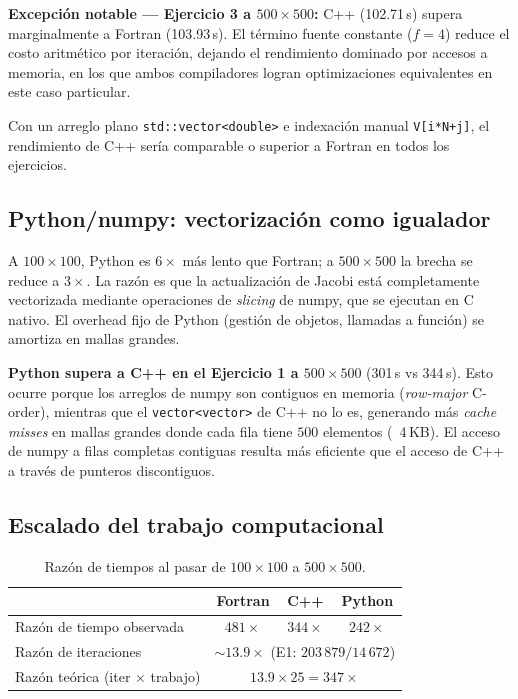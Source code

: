 \documentclass[12pt, a4paper]{article}
\begin{document}
\textbf{Excepción notable — Ejercicio 3 a $500\times500$:}
C++ (102.71\,s) supera marginalmente a Fortran (103.93\,s). El término fuente
constante ($f=4$) reduce el costo aritmético por iteración, dejando el
rendimiento dominado por accesos a memoria, en los que ambos compiladores
logran optimizaciones equivalentes en este caso particular.

Con un arreglo plano \texttt{std::vector<double>} e indexación manual
\texttt{V[i*N+j]}, el rendimiento de C++ sería comparable o superior
a Fortran en todos los ejercicios.

\subsection{Python/numpy: vectorización como igualador}

A $100\times100$, Python es $6\times$ más lento que Fortran; a $500\times500$
la brecha se reduce a $3\times$. La razón es que la actualización de Jacobi
está completamente vectorizada mediante operaciones de \emph{slicing} de numpy,
que se ejecutan en C nativo. El overhead fijo de Python (gestión de objetos,
llamadas a función) se amortiza en mallas grandes.

\textbf{Python supera a C++ en el Ejercicio 1 a $500\times500$} (301\,s vs
344\,s). Esto ocurre porque los arreglos de numpy son contiguos en memoria
(\emph{row-major} C-order), mientras que el \texttt{vector<vector>} de C++ no
lo es, generando más \emph{cache misses} en mallas grandes donde cada fila
tiene $500$ elementos (~4\,KB). El acceso de numpy a filas completas contiguas
resulta más eficiente que el acceso de C++ a través de punteros
discontiguos.

\subsection{Escalado del trabajo computacional}

\begin{table}[H]
  \centering
  \caption{Razón de tiempos al pasar de $100\times100$ a $500\times500$.}
  \label{tab:scaling}
  \begin{tabular}{lccc}
    \toprule
    & \textbf{Fortran} & \textbf{C++} & \textbf{Python} \\
    \midrule
    Razón de tiempo observada  & $481\times$ & $344\times$ & $242\times$ \\
    Razón de iteraciones        & \multicolumn{3}{c}{$\sim13.9\times$ (E1: $203\,879/14\,672$)} \\
    Razón teórica (iter $\times$ trabajo) & \multicolumn{3}{c}{$13.9\times25 = 347\times$} \\
    \bottomrule
  \end{tabular}
\end{table}
\end{document}
